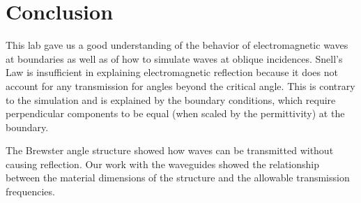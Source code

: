 \section{Conclusion}\label{sec:conclusion}
This lab gave us a good understanding of the behavior of electromagnetic waves at boundaries as well as of how to simulate waves at oblique incidences.
Snell's Law is insufficient in explaining electromagnetic reflection because it does not account for any transmission for angles beyond the critical angle.
This is contrary to the simulation and is explained by the boundary conditions, which require perpendicular components to be equal (when scaled by the permittivity) at the boundary.

The Brewster angle structure showed how waves can be transmitted without causing reflection.
Our work with the waveguides showed the relationship between the material dimensions of the structure and the allowable transmission frequencies.
